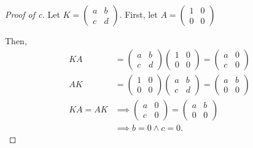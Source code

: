 \documentclass[../hw3]{subfiles}
\begin{document}
\begin{proof}[Proof of c]
	Let $K = \begin{pmatrix} a & b \\ c & d \end{pmatrix} $.
	First, let $A=\begin{pmatrix} 1 & 0 \\ 0 & 0 \end{pmatrix} $

	Then,
	\begin{align*}
		KA    & = \begin{pmatrix} a & b \\ c & d \end{pmatrix}\begin{pmatrix} 1 & 0 \\ 0 & 0 \end{pmatrix} = \begin{pmatrix} a & 0 \\ c & 0 \end{pmatrix} \\
		AK    & = \begin{pmatrix} 1 & 0 \\ 0 & 0 \end{pmatrix} \begin{pmatrix} a & b \\ c & d \end{pmatrix}= \begin{pmatrix} a & b \\ 0 & 0 \end{pmatrix} \\
		KA=AK & \implies \begin{pmatrix} a & 0 \\ c & 0 \end{pmatrix} = \begin{pmatrix} a & b \\ 0 & 0 \end{pmatrix}                                      \\
		      & \implies b = 0 \land c = 0
		.\end{align*}


\end{proof}
\end{document}
